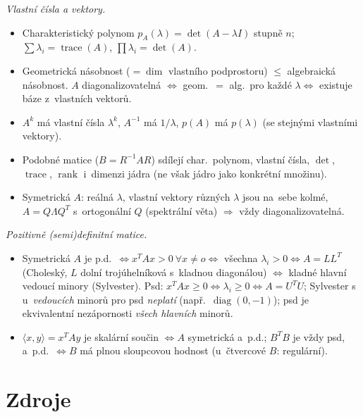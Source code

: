 \documentclass[11pt,a4paper]{article}
\newcommand{\rank}{\operatorname{rank}}
\newcommand{\tr}{\operatorname{trace}}
\begin{document}
\begin{poznamka}
\smallskip
\emph{Vlastní čísla a vektory.}
\begin{itemize}
  \item Charakteristický polynom $p_A(\lambda)=\det(A-\lambda I)$ stupně $n$; $\sum\lambda_i=\tr(A)$, $\prod\lambda_i=\det(A)$.
  \item Geometrická násobnost ($=\dim$ vlastního podprostoru) $\le$ algebraická násobnost. $A$ diagonalizovatelná $\iff$ geom.\ $=$ alg.\ pro každé $\lambda\iff$ existuje báze z~vlastních vektorů.
  \item $A^k$ má vlastní čísla $\lambda^k$, $A^{-1}$ má $1/\lambda$, $p(A)$ má $p(\lambda)$ (se stejnými vlastními vektory).
  \item Podobné matice ($B=R^{-1}AR$) sdílejí char.\ polynom, vlastní čísla, $\det$, $\tr$, $\rank$ i~dimenzi jádra (ne však jádro jako konkrétní množinu).
  \item Symetrická $A$: reálná $\lambda$, vlastní vektory různých $\lambda$ jsou na~sebe kolmé, $A=Q\Lambda Q^T$ s~ortogonální $Q$ (spektrální věta) $\Rightarrow$ vždy diagonalizovatelná.
\end{itemize}

\smallskip
\emph{Pozitivně (semi)definitní matice.}
\begin{itemize}
  \item Symetrická $A$ je p.d.\ $\iff x^TAx>0\ \forall x\ne o\iff$ všechna $\lambda_i>0\iff A=LL^T$ (Choleský, $L$ dolní trojúhelníková s~kladnou diagonálou) $\iff$ kladné hlavní vedoucí minory (Sylvester). Psd: $x^TAx\ge0\iff\lambda_i\ge0\iff A=U^TU$; Sylvester s~ u~\emph{vedoucích} minorů pro psd \emph{neplatí} (např.\ $\operatorname{diag}(0,-1)$); psd je ekvivalentní nezápornosti \emph{všech hlavních} minorů.
  \item $\langle x,y\rangle=x^TAy$ je skalární součin $\iff A$ symetrická a~p.d.; $B^TB$ je vždy psd, a~p.d.\ $\iff B$ má plnou sloupcovou hodnost (u~čtvercové $B$: regulární).
\end{itemize}
\end{poznamka}

\section*{Zdroje}
\end{document}

